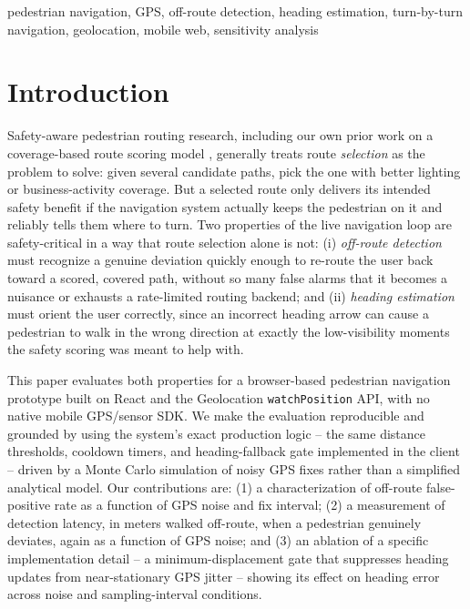 \documentclass[conference]{IEEEtran}
\begin{document}
\begin{IEEEkeywords}
pedestrian navigation, GPS, off-route detection, heading estimation, turn-by-turn navigation, geolocation, mobile web, sensitivity analysis
\end{IEEEkeywords}

\section{Introduction}

Safety-aware pedestrian routing research, including our own prior work on a coverage-based route scoring model \cite{ourscoring}, generally treats route \emph{selection} as the problem to solve: given several candidate paths, pick the one with better lighting or business-activity coverage. But a selected route only delivers its intended safety benefit if the navigation system actually keeps the pedestrian on it and reliably tells them where to turn. Two properties of the live navigation loop are safety-critical in a way that route selection alone is not: (i) \emph{off-route detection} must recognize a genuine deviation quickly enough to re-route the user back toward a scored, covered path, without so many false alarms that it becomes a nuisance or exhausts a rate-limited routing backend; and (ii) \emph{heading estimation} must orient the user correctly, since an incorrect heading arrow can cause a pedestrian to walk in the wrong direction at exactly the low-visibility moments the safety scoring was meant to help with.

This paper evaluates both properties for a browser-based pedestrian navigation prototype built on React and the Geolocation \texttt{watchPosition} API, with no native mobile GPS/sensor SDK. We make the evaluation reproducible and grounded by using the system's exact production logic -- the same distance thresholds, cooldown timers, and heading-fallback gate implemented in the client -- driven by a Monte Carlo simulation of noisy GPS fixes rather than a simplified analytical model. Our contributions are: (1) a characterization of off-route false-positive rate as a function of GPS noise and fix interval; (2) a measurement of detection latency, in meters walked off-route, when a pedestrian genuinely deviates, again as a function of GPS noise; and (3) an ablation of a specific implementation detail -- a minimum-displacement gate that suppresses heading updates from near-stationary GPS jitter -- showing its effect on heading error across noise and sampling-interval conditions.
\end{document}
